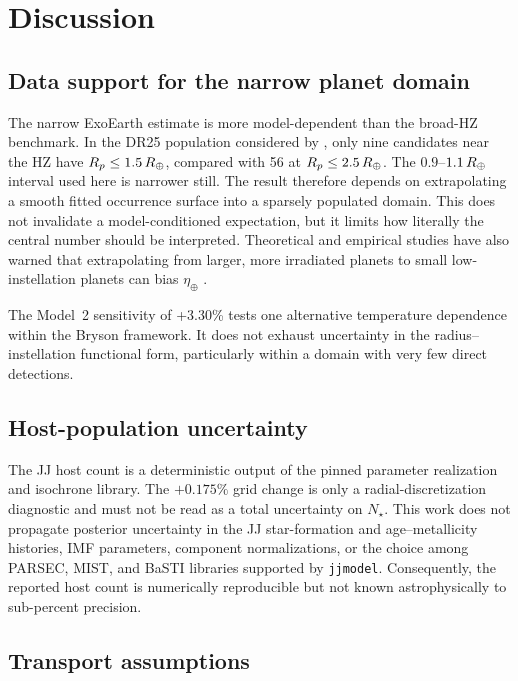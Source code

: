 \section{Discussion}\label{sec:discussion}

\subsection{Data support for the narrow planet domain}

The narrow ExoEarth estimate is more model-dependent than the broad-HZ benchmark. In the DR25 population considered by \citet{Bryson2021}, only nine candidates near the HZ have $R_p\leq1.5\,R_{\oplus}$, compared with 56 at $R_p\leq2.5\,R_{\oplus}$. The $0.9$--$1.1\,R_{\oplus}$ interval used here is narrower still. The result therefore depends on extrapolating a smooth fitted occurrence surface into a sparsely populated domain. This does not invalidate a model-conditioned expectation, but it limits how literally the central number should be interpreted. Theoretical and empirical studies have also warned that extrapolating from larger, more irradiated planets to small low-instellation planets can bias $\eta_\oplus$ \citep{LopezRice2018,Pascucci2019}.

The Model~2 sensitivity of +3.30\% tests one alternative temperature dependence within the Bryson framework. It does not exhaust uncertainty in the radius--instellation functional form, particularly within a domain with very few direct detections.

\subsection{Host-population uncertainty}

The JJ host count is a deterministic output of the pinned parameter realization and isochrone library. The $+0.175\%$ grid change is only a radial-discretization diagnostic and must not be read as a total uncertainty on $N_\star$. This work does not propagate posterior uncertainty in the JJ star-formation and age--metallicity histories, IMF parameters, component normalizations, or the choice among PARSEC, MIST, and BaSTI libraries supported by \texttt{jjmodel}. Consequently, the reported host count is numerically reproducible but not known astrophysically to sub-percent precision.

\subsection{Transport assumptions}\label{subsec:transport}

